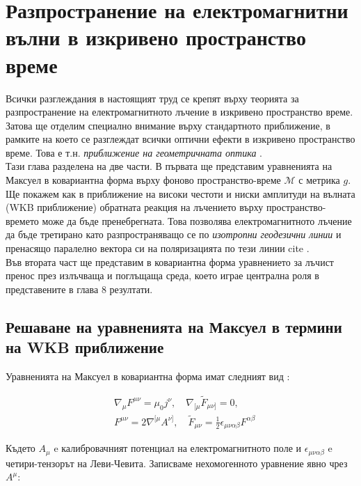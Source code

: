 \section{Разпространение на електромагнитни вълни в изкривено пространство време}

Всички разглеждания в настоящият труд се крепят върху теорията за разпространение на електромагнитното лъчение в изкривено пространство време. Затова ще отделим специално внимание върху стандартното приближение, в рамките на което се разглеждат всички оптични ефекти в изкривено пространство време. Това е т.н. \emph{приближение на геометричната оптика} \cite{Schneider1992}. \\

Тази глава разделена на две части. В първата ще представим уравненията на Максуел в ковариантна форма върху фоново пространство-време $\mathcal{M}$ с метрика $g$. Ще покажем как в приближение на високи честоти и ниски амплитуди на вълната (WKB приближение) обратната реакция на лъчението върху пространство-времето може да бъде пренебрегната. Това позволява електромагнитното лъчение да бъде третирано като разпространяващо се по \emph{изотропни геодезични линии} и пренасящо паралелно вектора си на поляризацията по тези линии cite \cite{Dolan2018}\cite{Oancea2020}.\\
Във втората част ще представим в ковариантна форма уравнението за лъчист пренос през излъчваща и поглъщаща среда, което играе централна роля в представените в глава 8 резултати.

\subsection{Решаване на уравненията на Максуел в термини на WKB приближение}

Уравненията на Максуел в ковариантна форма имат следният вид \cite{Weinberg1972}:

\begin{subequations}
	\begin{align}
	&\nabla_\mu F^{\mu\nu} = \mu_0 j^\nu,\quad \nabla_{[\mu}\tilde{F}_{\mu\nu]} = 0,\\
	&F^{\mu\nu} = 2\nabla^{[\mu}A^{\nu]}, \quad \tilde{F}_{\mu\nu} = \frac{1}{2}\epsilon_{\mu\nu\alpha\beta}F^{\alpha\beta}
	\end{align}
\end{subequations}

Където $A_\mu$ e калибровачният потенциал на електромагнитното поле и $\epsilon_{\mu\nu\alpha\beta}$ e четири-тензорът на Леви-Чевита. Записваме нехомогенното уравнение явно чрез $A^\mu$:

